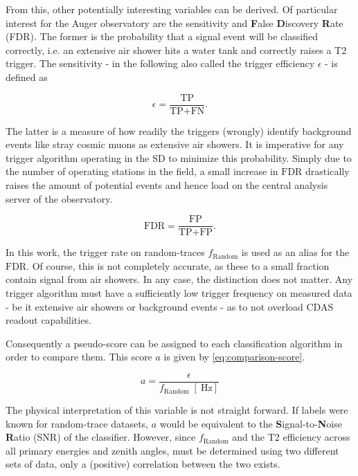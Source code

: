 From this, other potentially interesting variables can be derived. Of particular interest for the Auger observatory are the sensitivity and \textbf{F}alse 
\textbf{D}iscovery \textbf{R}ate (FDR). The former is the probability that a signal event will be classified correctly, i.e. an extensive air shower hits a 
water tank and correctly raises a T2 trigger. The sensitivity - in the following also called the trigger efficiency $\epsilon$ - is defined as


\begin{equation}
	\label{eq:statistics-efficiency}
	\epsilon = \frac{\text{TP}}{\text{TP} + \text{FN}}.
\end{equation}

The latter is a measure of how readily the triggers (wrongly) identify background events like stray cosmic muons as extensive air showers. It is imperative 
for any trigger algorithm operating in the SD to minimize this probability. Simply due to the number of operating stations in the field, a small increase in 
$\text{FDR}$ drastically raises the amount of potential events and hence load on the central analysis server of the observatory.


\begin{equation}
	\label{eq:statistics-efficiency}
	\text{FDR} = \frac{\text{FP}}{\text{TP} + \text{FP}}.
\end{equation}

In this work, the trigger rate on random-traces $f_\text{Random}$ is used as an alias for the $\text{FDR}$. Of course, this is not completely accurate, as these 
to a small fraction contain signal from air showers. In any case, the distinction does not matter. Any trigger algorithm must have a sufficiently low trigger 
frequency on measured data - be it extensive air showers or background events - as to not overload CDAS readout capabilities.

Consequently a pseudo-score can be assigned to each classification algorithm in order to compare them. This score $a$ is given by \autoref{eq:comparison-score}.

\begin{equation}
	\label{eq:comparison-score}
	a = \frac{\epsilon}{f_\text{Random}\;[\SI{}{\hertz}]}
\end{equation}

The physical interpretation of this variable is not straight forward. If labels were known for random-trace datasets, $a$ would be equivalent to the 
\textbf{S}ignal-to-\textbf{N}oise \textbf{R}atio (SNR) of the classifier. However, since $f_\text{Random}$ and the T2 efficiency across all primary energies and 
zenith angles, must be determined using two different sets of data, only a (positive) correlation between the two exists.

